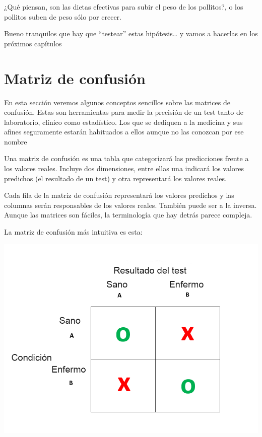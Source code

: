 \documentclass[
]{book}
\begin{document}
¿Qué piensan, son las dietas efectivas para subir el peso de los pollitos?, o los pollitos suben de peso sólo por crecer.

Bueno tranquilos que hay que ``testear'' estas hipótesis\ldots{} y vamos a hacerlas en los próximos capítulos

\hypertarget{matriz-de-confusiuxf3n}{%
\chapter{Matriz de confusión}\label{matriz-de-confusiuxf3n}}

En esta sección veremos algunos conceptos sencillos sobre las matrices de confusión. Estas son herramientas para medir la precisión de un test tanto de laboratorio, clínico como estadístico. Los que se dediquen a la medicina y sus afines seguramente estarán habituados a ellos aunque no las conozcan por ese nombre

Una matriz de confusión es una tabla que categorizará las predicciones frente a los valores reales. Incluye dos dimensiones, entre ellas una indicará los valores predichos (el resultado de un test) y otra representará los valores reales.

Cada fila de la matriz de confusión representará los valores predichos y las columnas serán responsables de los valores reales. También puede ser a la inversa. Aunque las matrices son fáciles, la terminología que hay detrás parece compleja.

La matriz de confusión más intuitiva es esta:

\includegraphics[width=11.6in]{img/matrix}
\end{document}
